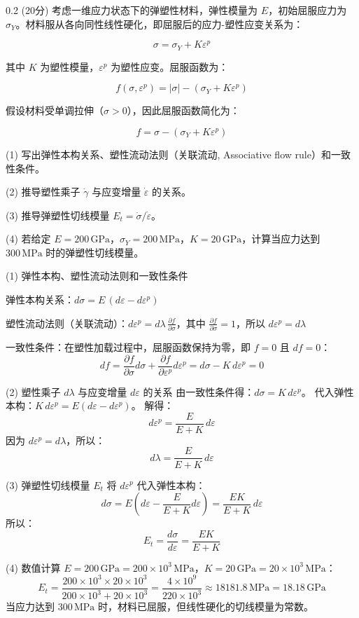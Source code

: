 \begin{question}{0.2}
    (20分) 考虑一维应力状态下的弹塑性材料，弹性模量为 \(E\)，初始屈服应力为 \(\sigma_Y\)。材料服从各向同性线性硬化，即屈服后的应力-塑性应变关系为：

    \[
\sigma = \sigma_Y + K \varepsilon^p
\]

其中 \(K\) 为塑性模量，\(\varepsilon^p\) 为塑性应变。屈服函数为：

\[
f(\sigma, \varepsilon^p) = |\sigma| - (\sigma_Y + K \varepsilon^p)
\]

假设材料受单调拉伸（\(\sigma > 0\)），因此屈服函数简化为：

\[
f = \sigma - (\sigma_Y + K \varepsilon^p)
\]

(1) 写出弹性本构关系、塑性流动法则（关联流动, Associative flow rule）和一致性条件。

(2) 推导塑性乘子 \(\dot \gamma\) 与应变增量 \(\dot \varepsilon\) 的关系。

(3) 推导弹塑性切线模量 \(E_t = \dot \sigma / \dot \varepsilon\)。

(4) 若给定 \(E = 200\,\text{GPa}\)，\(\sigma_Y = 200\,\text{MPa}\)，\(K = 20\,\text{GPa}\)，计算当应力达到 \(300\,\text{MPa}\) 时的弹塑性切线模量。
\end{question}
\begin{solution}
   (1) 弹性本构、塑性流动法则和一致性条件

   弹性本构关系：\( d\sigma = E \, (d\varepsilon - d\varepsilon^p) \)

   塑性流动法则（关联流动）：\( d\varepsilon^p = d\lambda \, \frac{\partial f}{\partial \sigma} \)，其中 \(\frac{\partial f}{\partial \sigma} = 1\)，所以 \( d\varepsilon^p = d\lambda \)

    一致性条件：在塑性加载过程中，屈服函数保持为零，即 \( f = 0 \) 且 \( df = 0 \)：
    \[
      df = \frac{\partial f}{\partial \sigma} d\sigma + \frac{\partial f}{\partial \varepsilon^p} d\varepsilon^p = d\sigma - K \, d\varepsilon^p = 0
     \]

(2) 塑性乘子 \(d\lambda\) 与应变增量 \(d\varepsilon\) 的关系
   由一致性条件得：\( d\sigma = K \, d\varepsilon^p \)。  
   代入弹性本构：\( K \, d\varepsilon^p = E (d\varepsilon - d\varepsilon^p) \)。  
   解得：
   \[
   d\varepsilon^p = \frac{E}{E + K} \, d\varepsilon
   \]
   因为 \( d\varepsilon^p = d\lambda \)，所以：
   \[
   d\lambda = \frac{E}{E + K} \, d\varepsilon
   \]

(3) 弹塑性切线模量 \(E_t\)
   将 \( d\varepsilon^p \) 代入弹性本构：
   \[
   d\sigma = E \left( d\varepsilon - \frac{E}{E + K} d\varepsilon \right) = \frac{EK}{E + K} \, d\varepsilon
   \]
   所以：
   \[
   E_t = \frac{d\sigma}{d\varepsilon} = \frac{EK}{E + K}
   \]

(4) 数值计算
   \( E = 200\,\text{GPa} = 200 \times 10^3\,\text{MPa} \)，\( K = 20\,\text{GPa} = 20 \times 10^3\,\text{MPa} \)：
   \[
   E_t = \frac{200 \times 10^3 \times 20 \times 10^3}{200 \times 10^3 + 20 \times 10^3} = \frac{4 \times 10^9}{220 \times 10^3} \approx 18181.8\,\text{MPa} = 18.18\,\text{GPa}
   \]
   当应力达到 \(300\,\text{MPa}\) 时，材料已屈服，但线性硬化的切线模量为常数。 
\end{solution}
